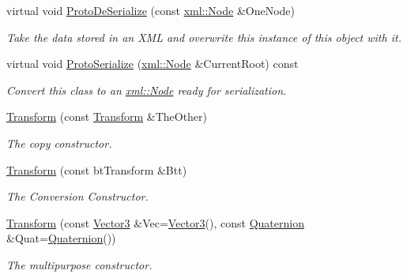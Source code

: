 \begin{DoxyCompactItemize}
virtual void \hyperlink{classphys_1_1Transform_a230f5731f07400998d5eed6c6b60f7a6}{ProtoDeSerialize} (const \hyperlink{classphys_1_1xml_1_1Node}{xml::Node} \&OneNode)
\begin{DoxyCompactList}\small\item\em Take the data stored in an XML and overwrite this instance of this object with it. \item\end{DoxyCompactList}\item 
virtual void \hyperlink{classphys_1_1Transform_a6a054d1eeb12a12451b8134acd8cb78a}{ProtoSerialize} (\hyperlink{classphys_1_1xml_1_1Node}{xml::Node} \&CurrentRoot) const 
\begin{DoxyCompactList}\small\item\em Convert this class to an \hyperlink{classphys_1_1xml_1_1Node}{xml::Node} ready for serialization. \item\end{DoxyCompactList}\item 
\hyperlink{classphys_1_1Transform_abd1b1ae62d8efd807a162a0a1ac35baa}{Transform} (const \hyperlink{classphys_1_1Transform}{Transform} \&TheOther)
\begin{DoxyCompactList}\small\item\em The copy constructor. \item\end{DoxyCompactList}\item 
\hyperlink{classphys_1_1Transform_a5b6867700fd10297a10208d389055a05}{Transform} (const btTransform \&Btt)
\begin{DoxyCompactList}\small\item\em The Conversion Constructor. \item\end{DoxyCompactList}\item 
\hyperlink{classphys_1_1Transform_aaf6c6fc02fbd2a1aaad0000757bc20f6}{Transform} (const \hyperlink{classphys_1_1Vector3}{Vector3} \&Vec=\hyperlink{classphys_1_1Vector3}{Vector3}(), const \hyperlink{classphys_1_1Quaternion}{Quaternion} \&Quat=\hyperlink{classphys_1_1Quaternion}{Quaternion}())
\begin{DoxyCompactList}\small\item\em The multipurpose constructor. \item\end{DoxyCompactList}\end{DoxyCompactItemize}
